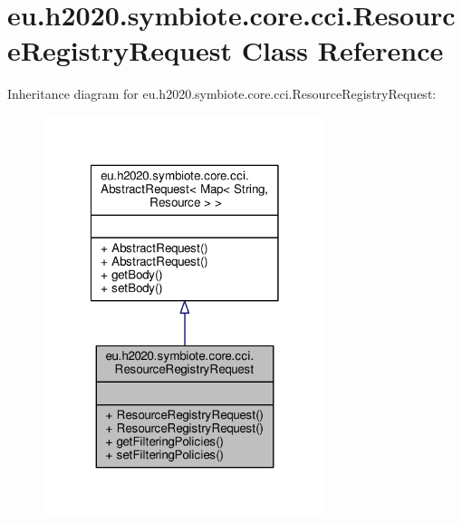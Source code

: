 \hypertarget{classeu_1_1h2020_1_1symbiote_1_1core_1_1cci_1_1ResourceRegistryRequest}{}\section{eu.\+h2020.\+symbiote.\+core.\+cci.\+Resource\+Registry\+Request Class Reference}
\label{classeu_1_1h2020_1_1symbiote_1_1core_1_1cci_1_1ResourceRegistryRequest}


Inheritance diagram for eu.\+h2020.\+symbiote.\+core.\+cci.\+Resource\+Registry\+Request\+:\nopagebreak
\begin{figure}[H]
\begin{center}
\leavevmode
\includegraphics[width=234pt]{classeu_1_1h2020_1_1symbiote_1_1core_1_1cci_1_1ResourceRegistryRequest__inherit__graph}
\end{center}
\end{figure}


